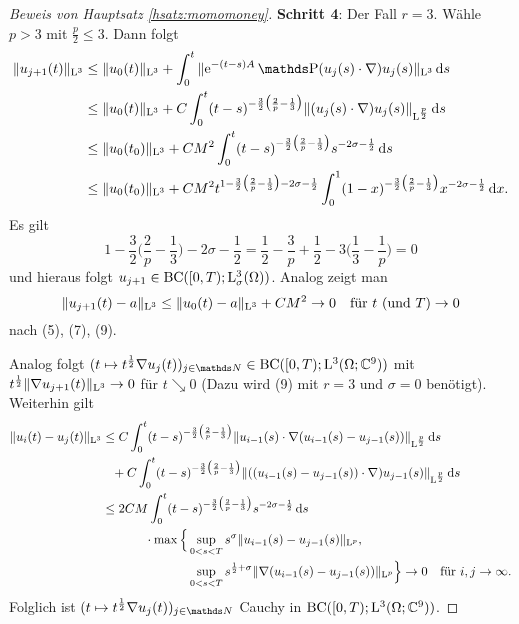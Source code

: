 \begin{proof}[Beweis von Hauptsatz \ref{hsatz:momomoney}]
  \textbf{Schritt 4}:
  Der Fall $r = 3$.
  Wähle $p > 3$ mit $\frac{p}{2} \leq 3$.
  Dann folgt
  \begin{align*}
    \|u_{j + 1}(t) \|_{\Ell^3}
    &\leq \|u_0(t)\|_{\Ell^3} + \int_0^t \|\e^{-(t - s) A} \PP (u_j(s) \cdot \nabla) u_j(s) \|_{\Ell^3} \d s \\
    &\leq \|u_0(t)\|_{\Ell^3} + C \int_0^t (t - s)^{-\frac{3}{2} \big( \frac{2}{p} - \frac{1}{3} \big)} \|(u_j(s) \cdot \nabla) u_j(s) \|_{\Ell^{\frac{p}{2}}} \d s \\
    &\leq \|u_0(t_0)\|_{\Ell^3} + C M^2 \int_0^t (t - s)^{-\frac{3}{2} \big( \frac{2}{p} - \frac{1}{3}\big)} s^{-2\sigma - \frac{1}{2}} \d s \\
    &\leq \|u_0(t_0)\|_{\Ell^3} + C M^2 t^{1 - \frac{3}{2} \big( \frac{2}{p} - \frac{1}{3} \big) - 2\sigma - \frac{1}{2}} \int_0^1 (1 - x)^{-\frac{3}{2} \big( \frac{2}{p} - \frac{1}{3} \big)} x^{-2\sigma - \frac{1}{2}} \d x.
  \end{align*}
  Es gilt
  $$
  1 - \frac{3}{2} \big( \frac{2}{p} - \frac{1}{3} \big) - 2\sigma - \frac{1}{2}
  = \frac{1}{2} - \frac{3}{p} + \frac{1}{2} - 3 \big( \frac{1}{3} - \frac{1}{p} \big)
  = 0
  $$
  und hieraus folgt $u_{j + 1} \in \mathrm{BC}([0,T); \mathrm{L}^3_\sigma(\Omega))$.
  Analog zeigt man
  $$
  \|u_{j + 1}(t) - a\|_{\mathrm{L}^3}
  \leq \|u_0(t) - a\|_{\mathrm{L}^3} + CM^2 \to 0 \quad \text{für } t \text{ (und $T$)} \to 0
  $$
  nach (5), (7), (9).

  Analog folgt $(t \mapsto t^{\frac{1}{2}} \nabla u_j(t))_{j \in \N} \in \mathrm{BC}([0,T); \Ell^3(\Omega; \C^9))$ mit $t^{\frac{1}{2}} \|\nabla u_{j + 1}(t) \|_{\mathrm{L}^3} \to 0$ für $t \searrow 0$ (Dazu wird (9) mit $r = 3$ und $\sigma = 0$ benötigt).
  Weiterhin gilt
  \begin{align*}
    \|u_i(t) - u_j(t)\|_{\Ell^3}
    &\leq C \int_0^t (t - s)^{-\frac{3}{2} \big( \frac{2}{p} - \frac{1}{3} \big)} \|u_{i - 1}(s) \cdot \nabla (u_{i - 1}(s) - u_{j - 1}(s)) \|_{\Ell^{\frac{p}{2}}} \d s \\
    &\hphantom{\leq} + C \int_0^t (t - s)^{-\frac{3}{2} \big( \frac{2}{p} - \frac{1}{3} \big)} \|((u_{i - 1}(s) - u_{j - 1}(s)) \cdot \nabla) u_{j - 1}(s) \|_{\Ell^{\frac{p}{2}}} \d s \\
    &\leq 2 C M \int_0^t (t - s)^{-\frac{3}{2} \big(\frac{2}{p} - \frac{1}{3} \big)} s^{-2\sigma - \frac{1}{2}} \d s \\
    &\hphantom{\leq 2 C M }\cdot \max \Big\{ \sup_{0 < s < T} s^\sigma \|u_{i - 1}(s) - u_{j - 1}(s) \|_{\Ell^p},\\
    &\hphantom{\leq 2 C M\cdot \max \Big\{ } \sup_{0 < s < T} s^{\frac{1}{2} + \sigma} \|\nabla(u_{i - 1}(s) - u_{j - 1}(s)) \|_{\Ell^p} \Big\} \to 0 \quad\text{für } i,j \to \infty.
  \end{align*}
  Folglich ist $(t \mapsto t^{\frac{1}{2}} \nabla u_j(t))_{j \in \N}$ Cauchy in $\mathrm{BC}([0,T); \mathrm{L}^3(\Omega; \mathbb{C}^9))$.
\end{proof}
